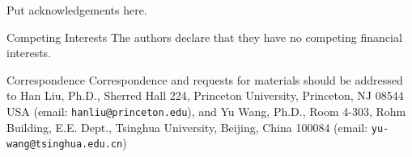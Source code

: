 \documentclass{nature}
\begin{document}





\begin{addendum}
 \item Put acknowledgements here.
 \item[Competing Interests] The authors declare that they have no
competing financial interests.
 \item[Correspondence] Correspondence and requests for materials should be
addressed to Han Liu, Ph.D., Sherred Hall 224, Princeton University, Princeton,
NJ 08544 USA (email: \texttt{hanliu@princeton.edu}), and Yu Wang, Ph.D., Room
4-303, Rohm Building, E.E. Dept., Tsinghua University, Beijing, China 100084 
(email: \texttt{yu-wang@tsinghua.edu.cn})
\end{addendum}

	
\end{document}
